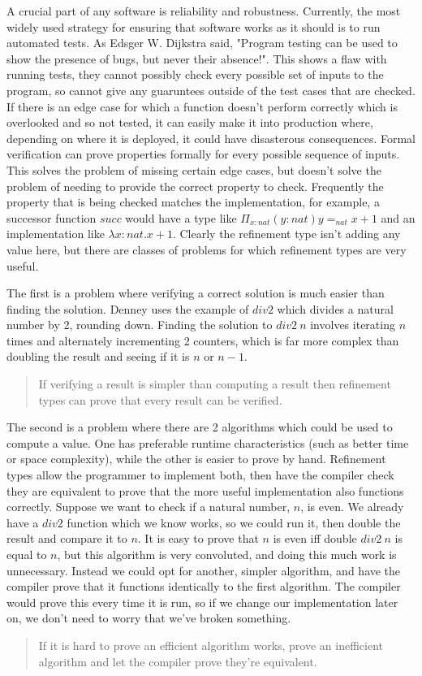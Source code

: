 A crucial part of any software is reliability and robustness.
Currently, the most widely used strategy for ensuring that software works as it should
is to run automated tests.
As Edsger W. Dijkstra said, "Program testing can be used to show the presence of bugs,
but never their absence!".
This shows a flaw with running tests, they cannot possibly check every possible set of inputs
to the program, so cannot give any guaruntees outside of the test cases that are checked.
If there is an edge case for which a function doesn't perform correctly which is overlooked
and so not tested, it can easily make it into production where, depending on where it is
deployed, it could have disasterous consequences.
Formal verification can prove properties formally for every possible sequence of inputs.
This solves the problem of missing certain edge cases, but doesn't solve the problem of
needing to provide the correct property to check.
Frequently the property that is being checked matches the implementation, for example,
a successor function $succ$ would have a type like $\Pi_{x:nat} (y:nat) y =_{nat} x+1$
and an implementation like $\lambda x:nat . x+1$.
Clearly the refinement type isn't adding any value here,
but there are classes of problems for which refinement types are very useful.

The first is a problem where verifying a correct solution is much easier than finding
the solution.
Denney uses the example of $div2$ which divides a natural number by 2, rounding down.
Finding the solution to $div2\ n$ involves iterating $n$ times and alternately incrementing
2 counters, which is far more complex than doubling the result and seeing if it is $n$ or
$n-1$.
\begin{quote}
    If verifying a result is simpler than computing a result then refinement types can prove that
    every result can be verified.
\end{quote}

The second is a problem where there are 2 algorithms which could be used to compute a value.
One has preferable runtime characteristics (such as better time or space complexity), while
the other is easier to prove by hand.
Refinement types allow the programmer to implement both, then have the compiler check they are
equivalent to prove that the more useful implementation also functions correctly.
Suppose we want to check if a natural number, $n$, is even.
We already have a $div2$ function which we know works, so we could run it, then double the
result and compare it to $n$.
It is easy to prove that $n$ is even iff double $div2\ n$ is equal to $n$, but this algorithm
is very convoluted, and doing this much work is unnecessary.
Instead we could opt for another, simpler algorithm, and have the compiler prove that it functions
identically to the first algorithm.
The compiler would prove this every time it is run, so if we change our implementation later on,
we don't need to worry that we've broken something.
\begin{quote}
    If it is hard to prove an efficient algorithm works, prove an inefficient algorithm and let the
    compiler prove they're equivalent.
\end{quote}

